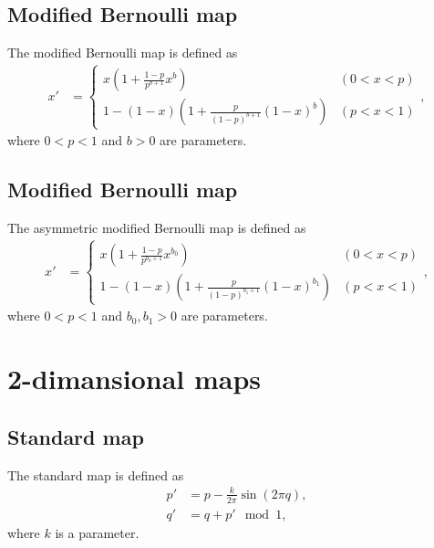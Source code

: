 \documentclass{article}
\begin{document}
\subsection*{Modified Bernoulli map}
The modified Bernoulli map is defined as
\begin{align*}
x'&=
\begin{cases}
x\left( 1+\frac{1-p}{p^{b+1}}x^b \right) & (0<x<p)\\
1-(1-x) \left( 1+ \frac{p}{ (1-p)^{b+1} }(1-x)^b\right) & (p<x<1)
\end{cases},
\end{align*}
where $0<p<1$ and $b>0$ are parameters.

\subsection*{Modified Bernoulli map}
The asymmetric modified Bernoulli map is defined as
\begin{align*}
x'&=
\begin{cases}
x\left( 1+\frac{1-p}{p^{b_0+1}}x^{b_0} \right) & (0<x<p)\\
1-(1-x) \left( 1+\frac{p}{(1-p)^{b_1+1}}(1-x)^{b_1}\right) & (p<x<1)
\end{cases},
\end{align*}
where $0<p<1$ and $b_0,b_1>0$ are parameters.


\section*{2-dimansional maps}

\subsection*{Standard map}
The standard map is defined as
\begin{align*}
p'&=p-\frac{k}{2\pi}\sin(2\pi q),\\
q'&=q+p'\mod 1,
\end{align*}
where $k$ is a parameter.

\end{document}

